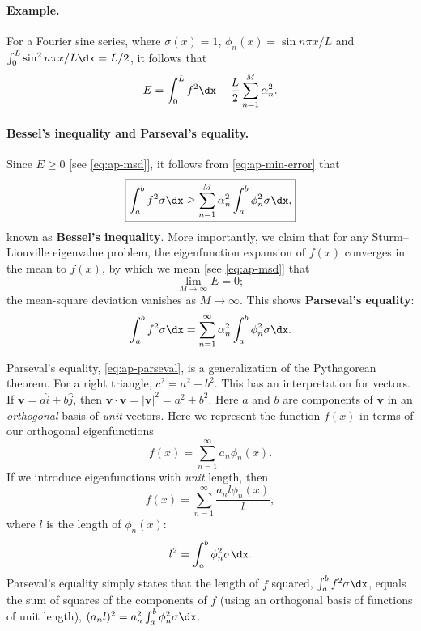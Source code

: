 \paragraph{Example.}
For a Fourier sine series, where $\sigma(x) = 1$, $\phi_n(x) = \sin n\pi x/L$ and $\int_0^L \sin^2 n\pi x/L\dx = L/2$, it follows that
\begin{equation}
\label{eq:ap-sine-error}
E = \int_0^L f^2\dx - \frac{L}{2}\sum_{n=1}^M \alpha_n^2.
\end{equation}

\paragraph{Bessel's inequality and Parseval's equality.}
Since $E \ge 0$ [see \eqref{eq:ap-msd}], it follows from \eqref{eq:ap-min-error} that
\begin{equation}
\label{eq:ap-bessel}
\boxed{\int_a^b f^2\sigma\dx \ge \sum_{n=1}^M \alpha_n^2\int_a^b \phi_n^2\sigma\dx,}
\end{equation}
known as \textbf{Bessel's inequality}.  More importantly, we claim that for any Sturm--Liouville eigenvalue problem, the eigenfunction expansion of $f(x)$ converges in the mean to $f(x)$, by which we mean [see \eqref{eq:ap-msd}] that
\[
\lim_{M\to\infty} E = 0;
\]
the mean-square deviation vanishes as $M \to \infty$.  This shows \textbf{Parseval's equality}:
\begin{equation}
\label{eq:ap-parseval}
\int_a^b f^2\sigma\dx = \sum_{n=1}^{\infty} \alpha_n^2\int_a^b \phi_n^2\sigma\dx.
\end{equation}

Parseval's equality, \eqref{eq:ap-parseval}, is a generalization of the Pythagorean theorem.  For a right triangle, $c^2 = a^2 + b^2$.  This has an interpretation for vectors.  If $\bm{v} = a\hat{i} + b\hat{j}$, then $\bm{v}\cdot\bm{v} = |\bm{v}|^2 = a^2 + b^2$.  Here $a$ and $b$ are components of $\bm{v}$ in an \textit{orthogonal} basis of \textit{unit} vectors.  Here we represent the function $f(x)$ in terms of our orthogonal eigenfunctions
\[
f(x) = \sum_{n=1}^{\infty} a_n\phi_n(x).
\]
If we introduce eigenfunctions with \textit{unit} length, then
\[
f(x) = \sum_{n=1}^{\infty} \frac{a_n l\phi_n(x)}{l},
\]
where $l$ is the length of $\phi_n(x)$:
\[
l^2 = \int_a^b \phi_n^2\sigma\dx.
\]
Parseval's equality simply states that the length of $f$ squared, $\int_a^b f^2\sigma\dx$, equals the sum of squares of the components of $f$ (using an orthogonal basis of functions of unit length), $(a_n l)^2 = a_n^2\int_a^b \phi_n^2\sigma\dx$.

